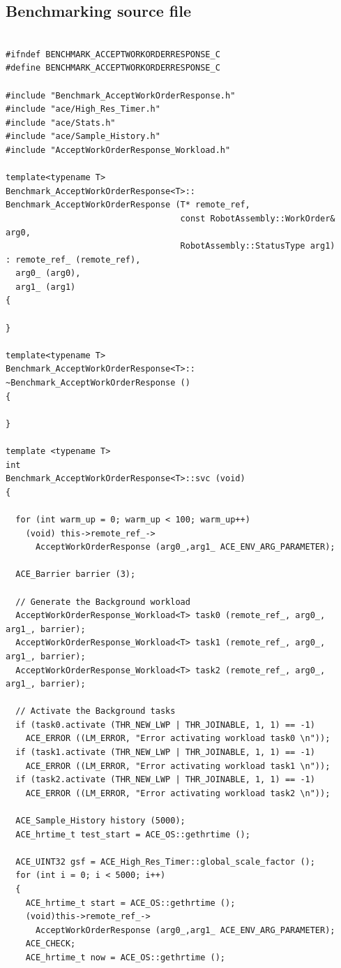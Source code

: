 \documentclass[onecolumn]{article}
\begin{document}
\subsection* {Benchmarking source file}

{
\footnotesize
\begin{verbatim}

#ifndef BENCHMARK_ACCEPTWORKORDERRESPONSE_C
#define BENCHMARK_ACCEPTWORKORDERRESPONSE_C

#include "Benchmark_AcceptWorkOrderResponse.h"
#include "ace/High_Res_Timer.h"
#include "ace/Stats.h"
#include "ace/Sample_History.h"
#include "AcceptWorkOrderResponse_Workload.h"

template<typename T>
Benchmark_AcceptWorkOrderResponse<T>::
Benchmark_AcceptWorkOrderResponse (T* remote_ref,
                                   const RobotAssembly::WorkOrder& arg0,
                                   RobotAssembly::StatusType arg1)
: remote_ref_ (remote_ref),
  arg0_ (arg0),
  arg1_ (arg1)
{

}

template<typename T>
Benchmark_AcceptWorkOrderResponse<T>::
~Benchmark_AcceptWorkOrderResponse ()
{

}

template <typename T>
int
Benchmark_AcceptWorkOrderResponse<T>::svc (void)
{

  for (int warm_up = 0; warm_up < 100; warm_up++)
    (void) this->remote_ref_->
      AcceptWorkOrderResponse (arg0_,arg1_ ACE_ENV_ARG_PARAMETER);

  ACE_Barrier barrier (3);

  // Generate the Background workload
  AcceptWorkOrderResponse_Workload<T> task0 (remote_ref_, arg0_, arg1_, barrier);
  AcceptWorkOrderResponse_Workload<T> task1 (remote_ref_, arg0_, arg1_, barrier);
  AcceptWorkOrderResponse_Workload<T> task2 (remote_ref_, arg0_, arg1_, barrier);

  // Activate the Background tasks
  if (task0.activate (THR_NEW_LWP | THR_JOINABLE, 1, 1) == -1)
    ACE_ERROR ((LM_ERROR, "Error activating workload task0 \n"));
  if (task1.activate (THR_NEW_LWP | THR_JOINABLE, 1, 1) == -1)
    ACE_ERROR ((LM_ERROR, "Error activating workload task1 \n"));
  if (task2.activate (THR_NEW_LWP | THR_JOINABLE, 1, 1) == -1)
    ACE_ERROR ((LM_ERROR, "Error activating workload task2 \n"));

  ACE_Sample_History history (5000);
  ACE_hrtime_t test_start = ACE_OS::gethrtime ();

  ACE_UINT32 gsf = ACE_High_Res_Timer::global_scale_factor ();
  for (int i = 0; i < 5000; i++)
  {
    ACE_hrtime_t start = ACE_OS::gethrtime ();
    (void)this->remote_ref_->
      AcceptWorkOrderResponse (arg0_,arg1_ ACE_ENV_ARG_PARAMETER);
    ACE_CHECK;
    ACE_hrtime_t now = ACE_OS::gethrtime ();


\end{verbatim}}
\end{document}
